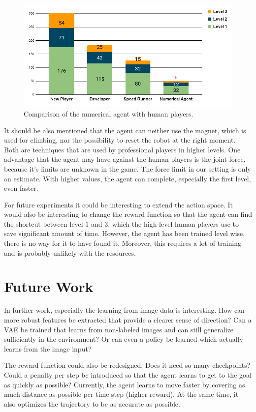 \documentclass[conference]{IEEEtran}
\begin{document}
\begin{figure}[!t]
  \centering
  \includegraphics[width=1.0\linewidth]{images/human_benchmarking.png}
  \caption{Comparison of the numerical agent with human players.}
\label{fig:Benchmarking}
\end{figure}

It should be also mentioned that the agent can neither use the magnet, which is used for climbing, nor the possibility to reset the robot at the right moment. Both are techniques that are used by professional players in higher levels. One advantage that the agent may have against the human players is the joint force, because it's limits are unknown in the game. The force limit in our setting is only an estimate. With higher values, the agent can complete, especially the first level, even faster.

For future experiments it could be interesting to extend the action space. It would also be interesting to change the reward function so that the agent can find the shortcut between level 1 and 3, which the high-level human players use to save significant amount of time. However, the agent has been trained level wise, there is no way for it to have found it. Moreover, this requires a lot of training and is probably unlikely with the resources.

\section{Future Work}
In further work, especially the learning from image data is interesting. How can more robust features be extracted that provide a clearer sense of direction? Can a VAE be trained that learns from non-labeled images and can still generalize sufficiently in the environment? Or can even a policy be learned which actually learns from the image input?

The reward function could also be redesigned. Does it need so many checkpoints? Could a penalty per step be introduced so that the agent learns to get to the goal as quickly as possible? Currently, the agent learns to move faster by covering as much distance as possible per time step (higher reward). At the same time, it also optimizes the trajectory to be as accurate as possible.
\end{document}
